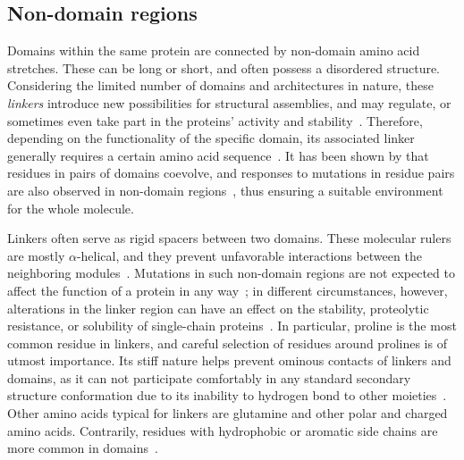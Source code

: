 \subsection{Non-domain regions}
\label{intro:linker}

  Domains within the same protein are connected by non-domain amino acid stretches.
  These can be long or short, and often possess a disordered structure.
  Considering the limited number of domains and architectures in nature, these
  \emph{linkers} introduce new possibilities for structural assemblies, and may regulate,
  or sometimes even take part in the proteins' activity and
  stability~\cite{papaleo2016role}.
  Therefore, depending on the functionality of the specific domain, its associated linker
  generally requires a certain amino acid sequence~\cite{gokhale2000role}.
  It has been shown by \citet{jakubec2018widespread} that residues in pairs of domains
  coevolve, and responses to mutations in residue pairs are also observed in non-domain
  regions~\cite{smock2010interdomain}, thus ensuring a suitable environment for the whole
  molecule.

  Linkers often serve as rigid spacers between two domains.
  These molecular rulers are mostly $\alpha$-helical, and they prevent unfavorable
  interactions between the neighboring
  modules~\cite{george2002analysis, wriggers2005control}.
  Mutations in such non-domain regions are not expected to affect the function of a
  protein in any way~\cite{bottema1991missense}; in different circumstances, however,
  alterations in the linker region can have an effect on the stability, proteolytic
  resistance, or solubility of single-chain proteins~\cite{robinson1998optimizing}.
  In particular, proline is the most common residue in linkers, and careful selection of residues around prolines is of utmost importance.
  Its stiff nature helps prevent ominous contacts of linkers and domains, as it can not
  participate comfortably in any standard secondary structure conformation due to its
  inability to hydrogen bond to other
  moieties~\cite{george2002analysis, wriggers2005control}.
  Other amino acids typical for linkers are glutamine and other polar and charged
  amino acids.
  Contrarily, residues with hydrophobic or aromatic side chains are more common in
  domains~\cite{brune2018proteome}.

